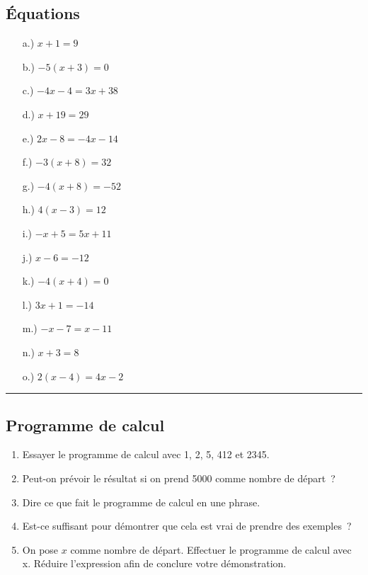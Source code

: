 \documentclass[11pt]{article}
\newcommand{\horrule}[1]{\rule{\linewidth}{#1}} %
\begin{document}
\subsection*{Équations}
\begin{multicols}{3}\noindent
  \begin{enumerate}
  \item[a.)] $x + 1 = 9$
  \item[b.)] $-5(x + 3) = 0$
  \item[c.)] $-4x - 4 = 3x + 38$
  \item[d.)] $x + 19 = 29$
  \item[e.)] $2x - 8 = -4x - 14$
  \item[f.)] $-3(x + 8) = 32$
  \item[g.)] $-4(x + 8) = -52$
  \item[h.)] $4(x - 3) = 12$
  \item[i.)] $-x + 5 = 5x + 11$
  \item[j.)] $x - 6 = -12$
  \item[k.)] $-4(x + 4) = 0$
  \item[l.)] $3x + 1 = -14$
  \item[m.)] $-x - 7 = x - 11$
  \item[n.)] $x + 3 = 8$
  \item[o.)] $2(x - 4) = 4x - 2$
  \end{enumerate}
\end{multicols}

\vspace{-0.4cm}
\horrule{1px}
\vspace{-0.8cm}

\subsection*{Programme de calcul}

\begin{enumerate}
  \item Essayer le programme de calcul avec 1, 2, 5, 412 et 2345.
  \item Peut-on prévoir le résultat si on prend 5000 comme nombre de départ ?
  \item Dire ce que fait le programme de calcul en une phrase.
  \item Est-ce suffisant pour démontrer que cela est vrai de prendre des exemples ?
  \item On pose $x$ comme nombre de départ. Effectuer le programme de calcul avec x. Réduire l’expression afin de conclure votre démonstration.
\end{enumerate}
\end{document}
